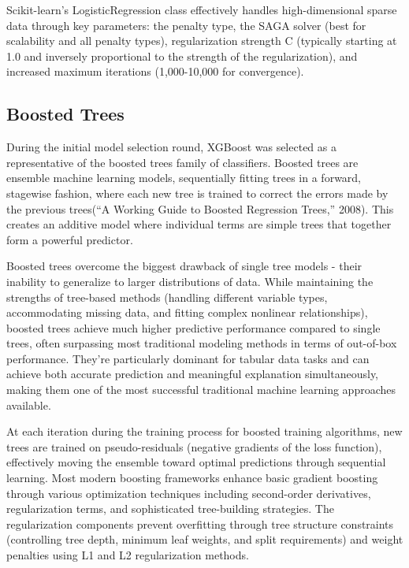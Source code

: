 \documentclass[
  titlepage]{article}
\begin{document}
Scikit-learn's LogisticRegression class effectively handles
high-dimensional sparse data through key parameters: the penalty type,
the SAGA solver (best for scalability and all penalty types),
regularization strength C (typically starting at 1.0 and inversely
proportional to the strength of the regularization), and increased
maximum iterations (1,000-10,000 for convergence).

\subsection{Boosted Trees}\label{boosted-trees}

During the initial model selection round, XGBoost was selected as a
representative of the boosted trees family of classifiers. Boosted trees
are ensemble machine learning models, sequentially fitting trees in a
forward, stagewise fashion, where each new tree is trained to correct
the errors made by the previous trees({``A Working Guide to Boosted
Regression Trees,''} 2008). This creates an additive model where
individual terms are simple trees that together form a powerful
predictor.

Boosted trees overcome the biggest drawback of single tree models -
their inability to generalize to larger distributions of data. While
maintaining the strengths of tree-based methods (handling different
variable types, accommodating missing data, and fitting complex
nonlinear relationships), boosted trees achieve much higher predictive
performance compared to single trees, often surpassing most traditional
modeling methods in terms of out-of-box performance. They're
particularly dominant for tabular data tasks and can achieve both
accurate prediction and meaningful explanation simultaneously, making
them one of the most successful traditional machine learning approaches
available.

At each iteration during the training process for boosted training
algorithms, new trees are trained on pseudo-residuals (negative
gradients of the loss function), effectively moving the ensemble toward
optimal predictions through sequential learning. Most modern boosting
frameworks enhance basic gradient boosting through various optimization
techniques including second-order derivatives, regularization terms, and
sophisticated tree-building strategies. The regularization components
prevent overfitting through tree structure constraints (controlling tree
depth, minimum leaf weights, and split requirements) and weight
penalties using L1 and L2 regularization methods.
\end{document}
